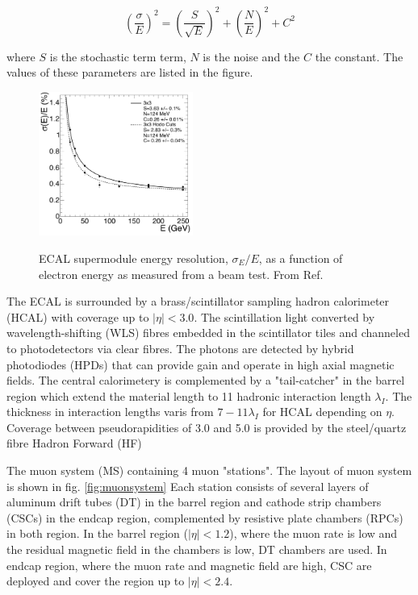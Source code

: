 \begin{equation}
    (\frac{\sigma}{E})^2 = (\frac{S}{\sqrt{E}})^2 + (\frac{N}{E})^2 + C^2
\end{equation}

where $S$ is the stochastic term term, $N$ is the noise and the $C$ the constant. The values of these parameters are listed in the figure.

\begin{figure}[!h]
    \centering
    \caption{ECAL supermodule energy resolution, $\sigma_E/E$, as a function of electron energy as measured from a beam test. From Ref.\cite{cmstdr}}
    \includegraphics[width=0.45\textwidth]{fig/energyresolution.png}
    \label{fig:energyresolution}
\end{figure}

The ECAL is surrounded by a brass/scintillator sampling hadron calorimeter (HCAL) with coverage up to $|\eta | < 3.0$. The scintillation light converted by wavelength-shifting (WLS) fibres embedded in the scintillator tiles and channeled to photodetectors via clear fibres. The photons are detected by hybrid photodiodes (HPDs) that can provide gain and operate in high axial magnetic fields. The central calorimetery is complemented by a "tail-catcher" in the barrel region which extend the material length to 11 hadronic interaction length $\lambda_I$. The thickness in interaction lengths varis from $7-11 \lambda_I$ for HCAL depending on $\eta$. Coverage between pseudorapidities of 3.0 and 5.0 is provided by the steel/quartz fibre Hadron Forward (HF) 

The muon system (MS) containing 4 muon "stations". The layout of muon system is shown in fig. \ref{fig:muonsystem} Each station consists of several layers of aluminum drift tubes (DT) in the barrel region and cathode strip chambers (CSCs) in the endcap region, complemented by resistive plate chambers (RPCs) in  both region. In the barrel region ($|\eta| < 1.2$), where the muon rate is low and the residual magnetic field in the chambers is low, DT chambers are used. In endcap region, where the muon rate and magnetic field are high, CSC are deployed and cover the region up to $|\eta| < 2.4$.

